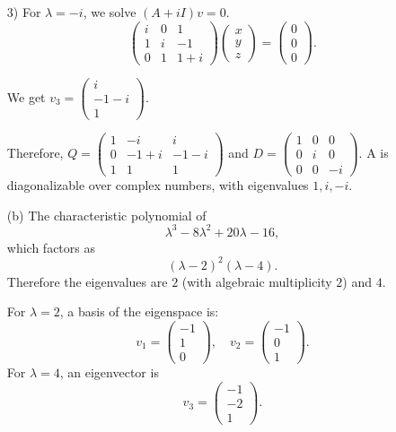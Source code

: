 \documentclass{article}
\begin{document}
\begin{itemize}
3) For \(\lambda = -i\), we solve \((A + iI)v = 0\).
\[
\begin{pmatrix}
i & 0 & 1\\
1 & i & -1\\
0 & 1 & 1+i
\end{pmatrix}
\begin{pmatrix}
x \\ y \\ z
\end{pmatrix}
= 
\begin{pmatrix}
0 \\ 0 \\ 0
\end{pmatrix}.
\]

We get $v_3 = \begin{pmatrix}i \\ -1-i \\ 1\end{pmatrix}$.

Therefore, $Q = \begin{pmatrix}1 & -i & i \\ 0 & -1+i & -1-i \\ 1 & 1 & 1\end{pmatrix}$ and $D = \begin{pmatrix}1 & 0 & 0 \\ 0 & i & 0 \\ 0 & 0 & -i\end{pmatrix}$. A is diagonalizable over complex numbers, with eigenvalues $1, i, -i$.

    \item[(b)]
    The characteristic polynomial of
\[
\lambda^3 - 8\lambda^2 + 20\lambda - 16,
\]
which factors as
\[
(\lambda - 2)^2 (\lambda - 4).
\]
Therefore the eigenvalues are \(2\) (with algebraic multiplicity \(2\)) and \(4\).

For \(\lambda = 2\), a basis of the eigenspace is:
\[
v_1 = \begin{pmatrix} -1 \\[6pt] 1 \\[6pt] 0 \end{pmatrix},
\quad
v_2 = \begin{pmatrix} -1 \\[6pt] 0 \\[6pt] 1 \end{pmatrix}.
\]
For \(\lambda = 4\), an eigenvector is
\[
v_3 = \begin{pmatrix} -1 \\[6pt] -2 \\[6pt] 1 \end{pmatrix}.
\]


\end{itemize}
\end{document}
